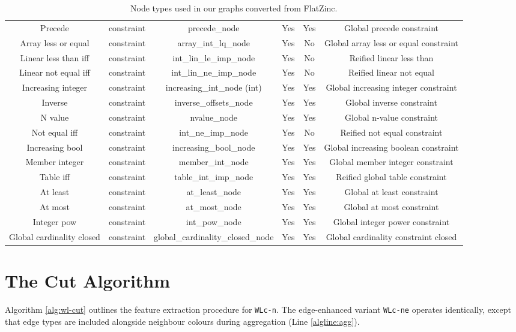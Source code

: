 \begin{table}
{\begin{tabular}{|c|c|c|c|c|c|}
 Precede & constraint & precede\_node & Yes & Yes & Global precede constraint \\
 Array less or equal & constraint & array\_int\_lq\_node & Yes & No & Global array less or equal constraint \\
 Linear less than iff & constraint & int\_lin\_le\_imp\_node & Yes & No & Reified linear less than \\
 Linear not equal iff & constraint & int\_lin\_ne\_imp\_node & Yes & No & Reified linear not equal \\
 Increasing integer & constraint & increasing\_int\_node (int) & Yes & Yes & Global increasing integer constraint \\
 Inverse & constraint & inverse\_offsets\_node & Yes & Yes & Global inverse constraint \\
 N value & constraint & nvalue\_node & Yes & Yes & Global n-value constraint \\
 Not equal iff & constraint & int\_ne\_imp\_node & Yes & No & Reified not equal constraint \\
 Increasing bool & constraint & increasing\_bool\_node & Yes & Yes & Global increasing boolean constraint \\
 Member integer & constraint & member\_int\_node & Yes & Yes & Global member integer constraint \\
 Table iff & constraint & table\_int\_imp\_node & Yes & Yes & Reified global table constraint \\
 At least & constraint & at\_least\_node & Yes & Yes & Global at least constraint \\
 At most & constraint & at\_most\_node & Yes & Yes & Global at most constraint \\
 Integer pow & constraint & int\_pow\_node & Yes & Yes & Global integer power constraint \\
 Global cardinality closed & constraint & global\_cardinality\_closed\_node & Yes & Yes & Global cardinality constraint closed \\
      \cline{1-6}
    \end{tabular}
 }
  \caption{Node types used in our graphs converted from FlatZinc.}
  \label{tab:nodes}
\end{table}

\section{The Cut Algorithm}\label{sec:cut-algorithm}
Algorithm \ref{alg:wl-cut} outlines the feature extraction procedure for \texttt{WLc-n}. The edge-enhanced variant \texttt{WLc-ne} operates identically, except that edge types are included alongside neighbour colours during aggregation (Line \ref{algline:agg}).

